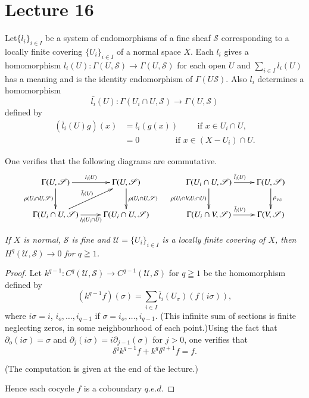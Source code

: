  \chapter{Lecture 16}\label{chap16:lec16}%
 
 Let\pageoriginale $\{l_i\}_{i \in I}$ be a system of endomorphisms of a
 fine sheaf $\mathscr{S}$ corresponding to a locally finite covering
 $\{U_i\}_{i \in I}$ of a normal space $X$. Each $l_i$ gives a
 homomorphism $l_i (U) :\Gamma (U, \mathscr{S}) \to \Gamma (U,
 \mathscr{S})$ for each open $U$ and $\sum\limits_{i \in I}
 l_i (U)$ has a meaning and is the identity endomorphism of $\Gamma (U
 \mathscr{S})$. Also $l_i$ determines a homomorphism  
 $$
 \bar{l_i} (U) : \Gamma (U_i \cap U, \mathscr{S}) \to \Gamma (U,
 \mathscr{S}) 
 $$
 defined by 
 \begin{align*}
(\bar{l}_i (U) g) (x) & = l_i (g(x)) \qquad \text{ if } x \in
   U_i \cap U,\\ 
& = 0 \qquad  \qquad \text{ if } x \in (X -U_i) \cap U. 
 \end{align*} 
 
 One verifies that the following diagrams are commutative.
{\fontsize{9}{11}\selectfont
\[
\xymatrix{
\Gamma(U,\mathscr{S}) \ar[r]^{l_i(U)} \ar[d]_{\rho (U_i \cap U,
  \mathscr{S})} & \Gamma(U,\mathscr{S}) \ar[d]^{\rho(U_i\cap U,
  \mathscr{S})} \\
\Gamma(U_i \cap U, \mathscr{S}) \ar[r]_{l_i (U_i \cap U)}
\ar[ur]^{\bar{l}_i (U)}& \Gamma
(U_i \cap U, \mathscr{S})
}\quad
\xymatrix{
\Gamma(U_i\cap U, \mathscr{S}) \ar[r]^{\bar{l}_i(U)} \ar[d]_{\rho (U_i \cap V,
 U_i\cap U)} & \Gamma(U,\mathscr{S}) \ar[d]^{\rho_{_{VU}}} \\
\Gamma(U_i \cap V, \mathscr{S}) \ar[r]^{\bar{l}_i(V)}
&  \Gamma(V, \mathscr{S})
}
\]}\relax

\textit{If $X$ is normal, $\mathscr{S}$ is fine and $\mathscr{U} = \{
  U_i\}_{i \in I}$ is a locally finite covering of $X$, then
  $H^q (\mathscr{U}, \mathscr{S}) \to 0$ for $q \geqq 1$.}
 
\begin{proof}
Let $k^{q - 1} : C^q (\mathscr{U}, \mathscr{S}) \to C^{q-1}
(\mathscr{U}, \mathscr{S})$ for $q \geqq 1$ be the homomorphism
defined by 
 $$
 (k^{q-1} f) (\sigma) = \sum_{i \in I} \bar{l}_i (U_\sigma) (f 
(i \sigma)),  
$$ 
 where $i \sigma=i$, $i_o ,\ldots,i_{q-1}$ if $\sigma = i_o
 ,\ldots,i_{q-1}$. (This infinite sum of sections is finite neglecting
 zeros, in some neighbourhood of each point.)\pageoriginale Using the
 fact that 
 $\partial_o (i \sigma) = \sigma$ and $\partial_j (i \sigma) =i
 \partial_{j-1} (\sigma)$ for $j > 0$, one verifies that  
 $$
 \delta^q k^{q-1} f + k^q \delta^{q+1} f =f. 
 $$
 
 (The computation is given at the end of the lecture.)
 
 Hence each cocycle $f$ is a coboundary $q.e.d$.
\end{proof}

